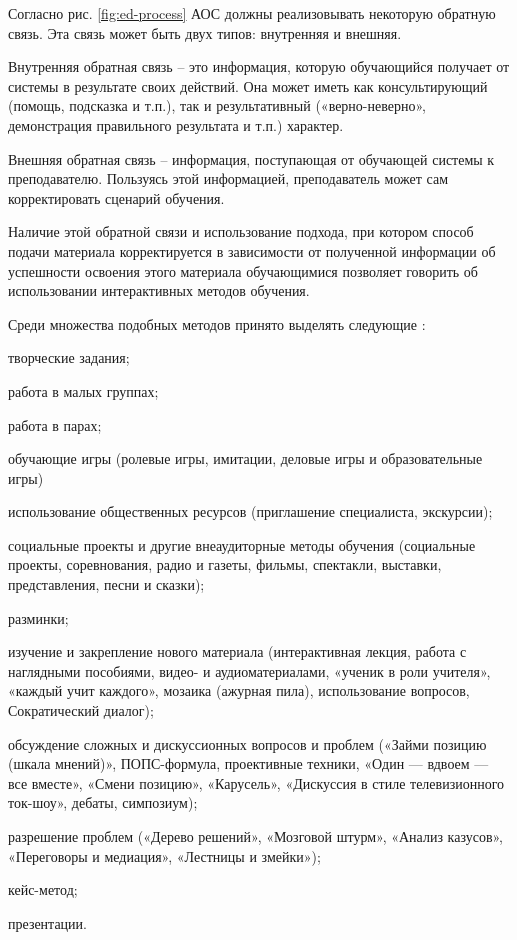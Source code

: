 Согласно рис. \ref{fig:ed-process} АОС должны реализовывать некоторую обратную связь. Эта связь может быть двух типов: внутренняя и внешняя.

Внутренняя обратная связь – это информация, которую обучающийся получает от системы в результате своих действий. Она может иметь как консультирующий (помощь, подсказка и т.п.), так и результативный («верно-неверно», демонстрация правильного результата и т.п.) характер.

Внешняя обратная связь – информация, поступающая от обучающей системы к преподавателю. Пользуясь этой информацией, преподаватель может сам корректировать сценарий обучения.

Наличие этой обратной связи и использование подхода, при котором способ подачи материала корректируется в зависимости от полученной информации об успешности освоения этого материала обучающимися позволяет говорить об использовании интерактивных методов обучения.

Среди множества подобных методов принято выделять следующие \cite{Cholak}:
\begin{itemize*}
\item творческие задания;
\item работа в малых группах;
\item работа в парах;
\item обучающие игры (ролевые игры, имитации, деловые игры и образовательные игры)
\item использование общественных ресурсов (приглашение специалиста, экскурсии);
\item социальные проекты и другие внеаудиторные методы обучения (социальные проекты, соревнования, радио и газеты, фильмы, спектакли, выставки, представления, песни и сказки);
\item разминки;
\item изучение и закрепление нового материала (интерактивная лекция, работа с наглядными пособиями, видео- и аудиоматериалами, «ученик в роли учителя», «каждый учит каждого», мозаика (ажурная пила), использование вопросов, Сократический диалог);
\item обсуждение сложных и дискуссионных вопросов и проблем («Займи позицию (шкала мнений)», ПОПС-формула, проективные техники, «Один — вдвоем — все вместе», «Смени позицию», «Карусель», «Дискуссия в стиле телевизионного ток-шоу», дебаты, симпозиум);
\item разрешение проблем («Дерево решений», «Мозговой штурм», «Анализ казусов», «Переговоры и медиация», «Лестницы и змейки»);
\item кейс-метод;
\item презентации.
\end{itemize*}

